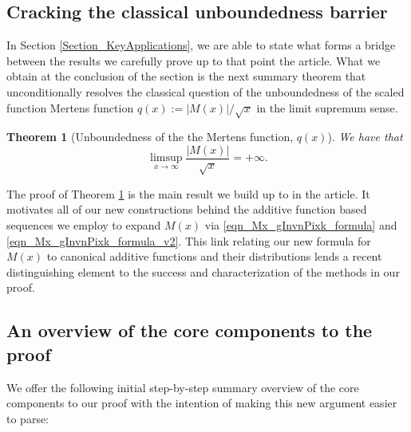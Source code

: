 \documentclass[11pt,reqno,a4letter]{article}
\numberwithin{figure}{section}
\numberwithin{table}{section}
\theoremstyle{plain}
\newtheorem{theorem}{Theorem}
\numberwithin{theorem}{section}
\theoremstyle{definition}
\begin{document}
\subsection{Cracking the classical unboundedness barrier} 

In Section \ref{Section_KeyApplications}, 
we are able to state what forms a bridge between the results 
we carefully prove up to that point the article. 
What we obtain at the conclusion of the section 
is the next summary theorem that unconditionally 
resolves the classical question of the 
unboundedness of the scaled function Mertens function 
$q(x) := |M(x)| / \sqrt{x}$ in the limit supremum sense. 

\begin{theorem}[Unboundedness of the the Mertens function, $q(x)$] 
\label{cor_ThePipeDreamResult_v1} 
We have that 
\[
\limsup_{x \rightarrow \infty} \frac{|M(x)|}{\sqrt{x}} = +\infty. 
\]
\end{theorem} 

The proof of Theorem \ref{cor_ThePipeDreamResult_v1} is 
the main result we build up to in the article. 
It motivates all of our new constructions behind the additive function based 
sequences we employ to expand $M(x)$ via 
\eqref{eqn_Mx_gInvnPixk_formula} and 
\eqref{eqn_Mx_gInvnPixk_formula_v2}. 
This link relating our new formula for $M(x)$ 
to canonical additive functions and their 
distributions lends a recent distinguishing element to the 
success and characterization of the methods in our proof. 

\subsection{An overview of the core components to the proof} 

We offer the following initial step-by-step summary overview of the core components 
to our proof with the intention of making this new argument easier to parse: 
\end{document}
